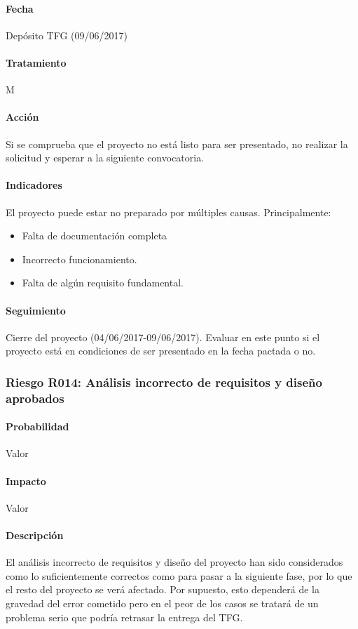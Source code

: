\documentclass[10pt,a4paper]{article}
\begin{document}
				\paragraph{Fecha} Depósito TFG (09/06/2017)
				\paragraph{Tratamiento} M
				\paragraph{Acción} Si se comprueba que el proyecto no está listo para ser presentado, no realizar la solicitud y esperar a la siguiente convocatoria.
				\paragraph{Indicadores} El proyecto puede estar no preparado por múltiples causas. Principalmente: 
				    \begin{itemize}
				        \item Falta de documentación completa
				        \item Incorrecto funcionamiento.
				        \item Falta de algún requisito fundamental.
				    \end{itemize}
				\paragraph{Seguimiento}	Cierre del proyecto (04/06/2017-09/06/2017). Evaluar en este punto si el proyecto está en condiciones de ser presentado en la fecha pactada o no.
				
				\subsubsection{Riesgo R014: Análisis incorrecto de requisitos y diseño aprobados}
				\paragraph{Probabilidad} Valor
				\paragraph{Impacto}	Valor
				\paragraph{Descripción} El análisis incorrecto de requisitos y diseño del proyecto han sido considerados como lo suficientemente correctos como para pasar a la siguiente fase, por lo que el resto del proyecto se verá afectado. Por supuesto, esto dependerá de la gravedad del error cometido pero en el peor de los casos se tratará de un problema serio que podría retrasar la entrega del TFG.
\end{document}
